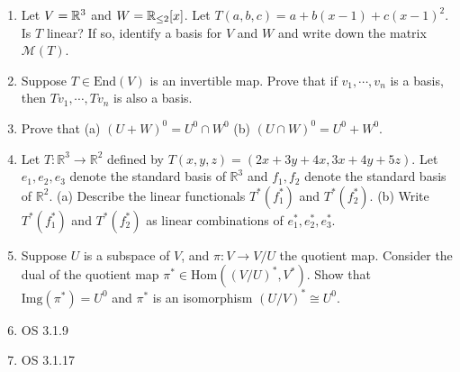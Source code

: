 \documentclass{amsart}
\begin{document}
	\begin{enumerate}
		\item 	Let $V=\mathbb{R}^3$ and $W = \mathbb{R}_{\leq 2}[x]$. Let $T(a,b,c)=a+b(x-1)+c(x-1)^2$. Is $T$ linear? If so, identify a basis for $V$ and $W$ and write down the matrix $\mathcal{M}(T)$.
		\item Suppose $T\in \text{End}(V)$ is an invertible map. Prove that if $v_1,\cdots,v_n$ is a basis, then $Tv_1,\cdots,Tv_n$ is also a basis.
		\item Prove that (a) $(U+W)^0=U^0\cap W^0 $ (b) $(U\cap W)^0=U^0+W^0$.
		\item Let $T:\mathbb{R}^3\to \mathbb{R}^2$ defined by
$T(x,y,z) = (2x+3y+4x,3x+4y+5z)$. Let $e_1,e_2,e_3$ denote the standard basis of $\mathbb{R}^3$ and $f_1,f_2$ denote the standard basis of $\mathbb{R}^2$.
(a) Describe the linear functionals $T^*(f_1^*)$ and $T^*(f_2^*)$.
(b) Write $T^*(f_1^*)$ and $T^*(f_2^*)$ as linear combinations of $e_1^*,e_2^*,e_3^*$.
\item Suppose $U$ is a subspace of $V$, and $\pi:V\to V/U$ the quotient map. Consider the dual of the quotient map $\pi^*\in \text{Hom}((V/U)^*,V^*)$. Show that $\text{Img}(\pi^*)=U^0$ and $\pi^*$ is an isomorphism $(U/V)^*\cong U^0$.
\item {OS 3.1.9}
		\item {OS 3.1.17} 
	 	\end{enumerate}
	 	
	
\end{document}

